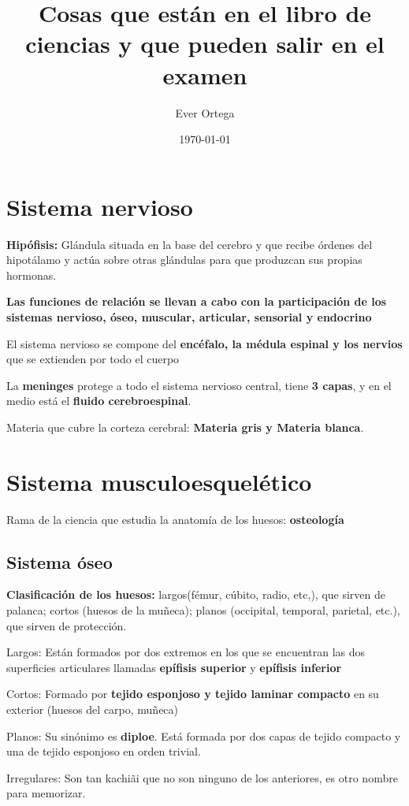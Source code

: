 \documentclass{article}
\title{Cosas que están en el libro de ciencias y que pueden salir en el examen}
\author{Ever Ortega}
\date{\today}
\begin{document}
\section{Sistema nervioso}
  \textbf{Hipófisis:} 
  Glándula situada en la base del cerebro y que recibe órdenes del hipotálamo
  y actúa sobre otras glándulas para que produzcan sus propias hormonas.

  \textbf{Las funciones de relación se llevan a cabo con la participación de 
  los sistemas nervioso, óseo, muscular, articular, sensorial y endocrino}

  El sistema nervioso se compone del \textbf{encéfalo, la médula espinal y los
  nervios} que se extienden por todo el cuerpo

  La \textbf{meninges} protege a todo el sistema nervioso central, tiene \textbf{3 capas}, y en el medio está el \textbf{fluido cerebroespinal}.

  Materia que cubre la corteza cerebral: \textbf{Materia gris y Materia blanca}.
\section{Sistema musculoesquelético}
Rama de la ciencia que estudia la anatomía de los huesos: \textbf{osteología}

\subsection{Sistema óseo}
\textbf{Clasificación de los huesos:} largos(fémur, cúbito, radio, etc,),
que sirven de palanca; cortos (huesos de la muñeca); planos (occipital,
temporal, parietal, etc.), 
que sirven de protección.

\vspace{0.5cm}
Largos: Están formados por dos extremos en los que se encuentran las dos
superficies articulares llamadas \textbf{epífisis superior} y
\textbf{epífisis inferior}

\vspace{0.5cm}
Cortos: Formado por \textbf{tejido esponjoso y tejido laminar compacto} en su
exterior (huesos del carpo, muñeca)

\vspace{0.5cm}
Planos: Su sinónimo es \textbf{diploe}. Está formada por dos capas de
tejido compacto y una de tejido esponjoso en orden trivial.

\vspace{0.5cm}
Irregulares: Son tan kachiãi que no son ninguno de los anteriores, es 
otro nombre para memorizar.
\end{document}
